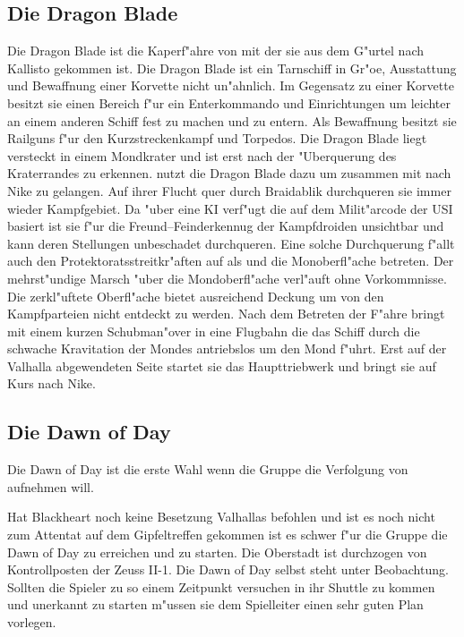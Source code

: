 \subsection{Die Dragon Blade}

Die Dragon Blade ist die Kaperf"ahre von \xl{} mit der sie aus dem G"urtel nach Kallisto gekommen ist. Die Dragon Blade 
ist ein Tarnschiff in Gr"o\3e, Ausstattung und Bewaffnung einer Korvette nicht un"ahnlich. Im Gegensatz zu einer Korvette 
besitzt sie einen Bereich f"ur ein Enterkommando und Einrichtungen um leichter an einem anderen Schiff fest zu machen 
und zu entern. Als Bewaffnung besitzt sie Railguns f"ur den Kurzstreckenkampf und Torpedos. Die Dragon Blade liegt versteckt in einem Mondkrater und ist erst nach der "Uberquerung des Kraterrandes zu erkennen. \xl{} nutzt die Dragon Blade dazu um zusammen mit \ml{} nach Nike zu gelangen. Auf ihrer Flucht quer durch Braidablik durchqueren sie immer wieder Kampfgebiet. Da \xl{} "uber eine KI verf"ugt die auf dem Milit"arcode der USI basiert ist sie f"ur die Freund--Feinderkennug der Kampfdroiden unsichtbar und kann deren Stellungen unbeschadet durchqueren. Eine solche Durchquerung f"allt auch den Protektoratsstreitkr"aften auf als \xl{} und \ml{} die Monoberfl"ache betreten. Der mehrst"undige Marsch "uber die Mondoberfl"ache verl"auft ohne Vorkommnisse. Die zerkl"uftete Oberfl"ache bietet ausreichend Deckung um von den Kampfparteien nicht entdeckt zu werden. Nach dem Betreten der F"ahre bringt \xl{} mit einem kurzen Schubman"over in eine Flugbahn die das Schiff durch die schwache Kravitation der Mondes antriebslos um den Mond f"uhrt. Erst auf der Valhalla abgewendeten Seite startet sie das Haupttriebwerk und bringt sie auf Kurs nach Nike. 

\subsection{Die Dawn of Day}
Die Dawn of Day ist die erste Wahl wenn die Gruppe die Verfolgung von \xl{} aufnehmen will.

Hat Blackheart noch keine Besetzung Valhallas befohlen und ist es noch nicht zum Attentat auf dem Gipfeltreffen gekommen 
ist es schwer f"ur die Gruppe die Dawn of Day zu erreichen und zu starten. Die Oberstadt ist durchzogen von 
Kontrollposten der Zeuss II-1. Die Dawn of Day selbst steht unter Beobachtung. Sollten die Spieler zu 
so einem Zeitpunkt versuchen in ihr Shuttle zu kommen und unerkannt zu starten m"ussen sie dem Spielleiter einen sehr guten Plan vorlegen.

